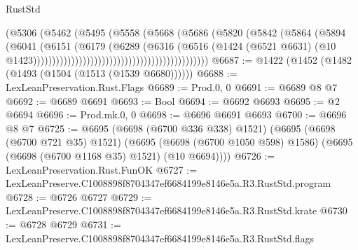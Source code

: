 \begin{lexlean}{RustStd}
\begin{coremodule}
                                                            (@5306
                                                              (@5462
                                                                (@5495
                                                                  (@5558
                                                                    (@5668
                                                                      (@5686
                                                                        (@5820
                                                                          (@5842
                                                                            (@5864
                                                                              (@5894
                                                                                (@6041
                                                                                  (@6151
                                                                                    (@6179
                                                                                      (@6289
                                                                                        (@6316
                                                                                          (@6516
                                                                                            (@1424
                                                                                              (@6521
                                                                                                @6631)
                                                                                              (@10
                                                                                                @1423))))))))))))))))))))))))))))))))))))))))))))))
@6687 := @1422 (@1452 (@1482 (@1493 (@1504 (@1513 (@1539 @6680))))))
@6688 := LexLeanPreservation.Rust.Flags
@6689 := Prod.{0, 0}
@6691 := @6689 @8 @7
@6692 := @6689 @6691
@6693 := Bool
@6694 := @6692 @6693
@6695 := @2 @6694
@6696 := Prod.mk.{0, 0}
@6698 := @6696 @6691 @6693
@6700 := @6696 @8 @7
@6725 := @6695
    (@6698 (@6700 @336 @338) @1521)
    (@6695
      (@6698 (@6700 @721 @35) @1521)
      (@6695 (@6698 (@6700 @1050 @598) @1586) (@6695 (@6698 (@6700 @1168 @35) @1521) (@10 @6694))))
@6726 := LexLeanPreservation.Rust.FunOK
@6727 := LexLeanPreserve.C1008898f8704347ef6684199e8146e5a.R3.RustStd.program
@6728 := @6726 @6727
@6729 := LexLeanPreserve.C1008898f8704347ef6684199e8146e5a.R3.RustStd.krate
@6730 := @6728 @6729
@6731 := LexLeanPreserve.C1008898f8704347ef6684199e8146e5a.R3.RustStd.flags

\end{coremodule}
\end{lexlean}
